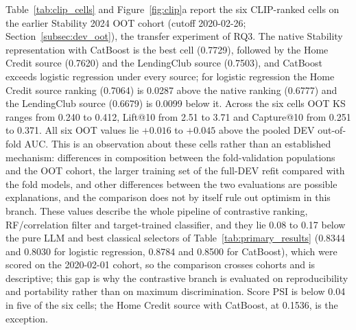 \documentclass[final,5p,twocolumn]{elsarticle}
\begin{document}
Table~\ref{tab:clip_cells} and Figure~\ref{fig:clip}a report the six CLIP-ranked cells on the earlier Stability 2024 OOT cohort (cutoff 2020-02-26; Section~\ref{subsec:dev_oot}), the transfer experiment of RQ3. The native Stability representation with CatBoost is the best cell (0.7729), followed by the Home Credit source (0.7620) and the LendingClub source (0.7503), and CatBoost exceeds logistic regression under every source; for logistic regression the Home Credit source ranking (0.7064) is 0.0287 above the native ranking (0.6777) and the LendingClub source (0.6679) is 0.0099 below it. Across the six cells OOT KS ranges from 0.240 to 0.412, Lift@10 from 2.51 to 3.71 and Capture@10 from 0.251 to 0.371. All six OOT values lie $+0.016$ to $+0.045$ above the pooled DEV out-of-fold AUC. This is an observation about these cells rather than an established mechanism: differences in composition between the fold-validation populations and the OOT cohort, the larger training set of the full-DEV refit compared with the fold models, and other differences between the two evaluations are possible explanations, and the comparison does not by itself rule out optimism in this branch. These values describe the whole pipeline of contrastive ranking, RF/correlation filter and target-trained classifier, and they lie 0.08 to 0.17 below the pure LLM and best classical selectors of Table~\ref{tab:primary_results} (0.8344 and 0.8030 for logistic regression, 0.8784 and 0.8500 for CatBoost), which were scored on the 2020-02-01 cohort, so the comparison crosses cohorts and is descriptive; this gap is why the contrastive branch is evaluated on reproducibility and portability rather than on maximum discrimination. Score PSI is below 0.04 in five of the six cells; the Home Credit source with CatBoost, at 0.1536, is the exception.
\end{document}
